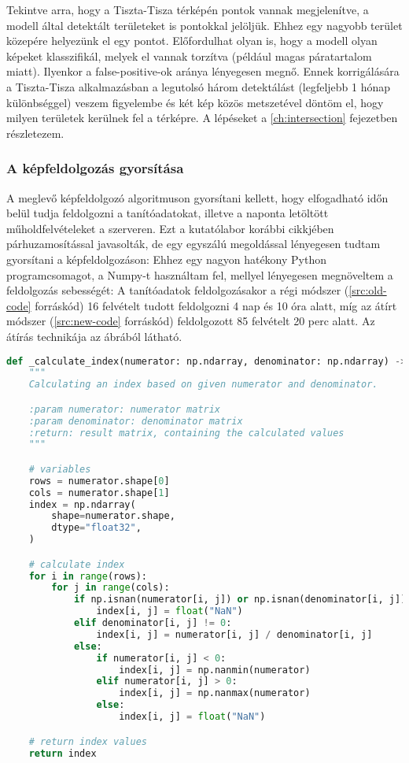 Tekintve arra, hogy a Tiszta-Tisza térképén pontok vannak megjelenítve, a modell által detektált területeket is pontokkal jelöljük. Ehhez egy nagyobb terület közepére helyezünk el egy pontot. Előfordulhat olyan is, hogy a modell olyan képeket klasszifikál, melyek el vannak torzítva (például magas páratartalom miatt). Ilyenkor a false-positive-ok aránya lényegesen megnő. Ennek korrigálására a Tiszta-Tisza alkalmazásban a legutolsó három detektálást (legfeljebb 1 hónap különbséggel) veszem figyelembe és két kép közös metszetével döntöm el, hogy milyen területek kerülnek fel a térképre. A lépéseket a \ref{ch:intersection} fejezetben részletezem.

\subsubsection {A képfeldolgozás gyorsítása}
A meglevő képfeldolgozó algoritmuson gyorsítani kellett, hogy elfogadható időn belül tudja feldolgozni a tanítóadatokat, illetve a naponta letöltött műholdfelvételeket a szerveren. Ezt a kutatólabor korábbi cikkjében párhuzamosítással javasolták, de egy egyszálú megoldással lényegesen tudtam gyorsítani a képfeldolgozáson: Ehhez egy nagyon hatékony Python programcsomagot, a Numpy-t \cite{harris2020array} használtam fel, mellyel lényegesen megnöveltem a feldolgozás sebességét: A tanítóadatok feldolgozásakor a régi módszer (\ref{src:old-code} forráskód) 16 felvételt tudott feldolgozni 4 nap és 10 óra alatt, míg az átírt módszer (\ref{src:new-code} forráskód) feldolgozott 85 felvételt 20 perc alatt. Az átírás technikája az  ábrából látható.

\begin{lstlisting}[language={Python}]
def _calculate_index(numerator: np.ndarray, denominator: np.ndarray) -> np.ndarray:
    """
    Calculating an index based on given numerator and denominator.

    :param numerator: numerator matrix
    :param denominator: denominator matrix
    :return: result matrix, containing the calculated values
    """

    # variables
    rows = numerator.shape[0]
    cols = numerator.shape[1]
    index = np.ndarray(
        shape=numerator.shape,
        dtype="float32",
    )

    # calculate index
    for i in range(rows):
        for j in range(cols):
            if np.isnan(numerator[i, j]) or np.isnan(denominator[i, j]):
                index[i, j] = float("NaN")
            elif denominator[i, j] != 0:
                index[i, j] = numerator[i, j] / denominator[i, j]
            else:
                if numerator[i, j] < 0:
                    index[i, j] = np.nanmin(numerator)
                elif numerator[i, j] > 0:
                    index[i, j] = np.nanmax(numerator)
                else:
                    index[i, j] = float("NaN")

    # return index values
    return index
\end{lstlisting}


